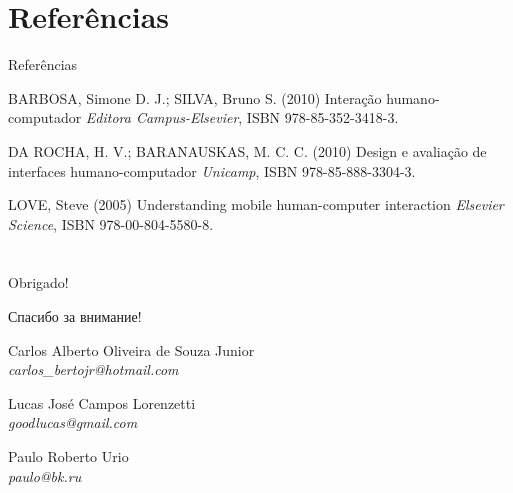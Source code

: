\documentclass[14pt,beamer]{beamer}
\newcommand\cyrtext[1]{{\fontencoding{T2A}\selectfont #1}}
\begin{document}

\section*{Referências}

\begin{frame}{Referências}

	\footnotesize{
	\begin{thebibliography}{99}
	\beamertemplatebookbibitems
	 BARBOSA, Simone D. J.; SILVA, Bruno S. (2010)
	\newblock Interação humano-computador
	\newblock \emph{Editora Campus-Elsevier}, ISBN 978-85-352-3418-3.

	 DA ROCHA, H. V.; BARANAUSKAS, M. C. C. (2010)
	\newblock Design e avalia{\c{c}}{\~a}o de interfaces humano-computador
	\newblock \emph{Unicamp}, ISBN 978-85-888-3304-3.
	
	 LOVE, Steve (2005)
	\newblock Understanding mobile human-computer interaction
	\newblock \emph{Elsevier Science}, ISBN 978-00-804-5580-8.
	\end{thebibliography}
	}

\end{frame}

\section*{}

\begin{frame}
	\vspace{-15px}
	\begin{center}
		\Huge{Obrigado!}

		\small

		\cyrtext{Спасибо за внимание!}
	\end{center}

	\vspace{15px}
	\small Carlos Alberto Oliveira de Souza Junior \\
	\footnotesize{  \textsl{carlos\_bertojr@hotmail.com} }
	
	\vspace{20px}
	\small Lucas José Campos Lorenzetti \\
	\footnotesize{  \textsl{goodlucas@gmail.com} }
	
	\vspace{20px}
	\small Paulo Roberto Urio \\
	\footnotesize{  \textsl{paulo@bk.ru} }
\end{frame}
\end{document}
